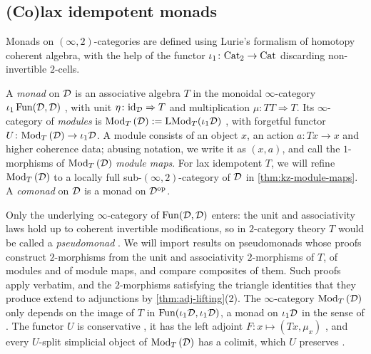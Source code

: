 \subsection{(Co)lax idempotent monads}
\label{subsec:prelim-monads}

%
Monads on $ (\infty, 2) $-categories are defined using
Lurie's formalism of homotopy coherent algebra, with the help of
the functor
$ \iota _{1} \colon \mathrm{Cat}_{2} \to \mathrm{Cat} $
discarding non-invertible $ 2 $-cells.

\begin{defi}
\label{def:monad}
%
A \emph{monad} on $\mathcal{D}$ is an associative algebra $T$ in the monoidal
$\infty$-category
$\iota_{1}\operatorname{Fun}(\mathcal{D},\mathcal{D})$
\cite[Def.~4.1.1.6]{ha}, with unit
$\eta\colon \mathrm{id}_{\mathcal{D}} \Rightarrow T$
and multiplication
$\mu\colon TT \Rightarrow T$.
Its $\infty$-category of \emph{modules} is
${\operatorname{Mod}_{T}\left(\mathcal{D}\right)} := \mathrm{LMod}_{T}(\iota_{1}\mathcal{D})$
\cite[Def.~4.2.1.13]{ha}, with forgetful functor
$U\colon {\operatorname{Mod}_{T}\left(\mathcal{D}\right)} \to \iota_{1}\mathcal{D}$.
A module consists of an object $x$, an action $a\colon Tx \to x$ and higher
coherence data; abusing notation, we write it as $(x,a)$,
and call the $1$-morphisms of ${\operatorname{Mod}_{T}\left(\mathcal{D}\right)}$ \emph{module maps}.
For lax idempotent $T$, we will refine ${\operatorname{Mod}_{T}\left(\mathcal{D}\right)}$ to a locally full
sub-$(\infty,2)$-category of $\mathcal{D}$ in \cref{thm:kz-module-maps}.
A \emph{comonad} on $\mathcal{D}$ is a monad on $\mathcal{D}^{\mathrm{op}}$.
\end{defi}

%
Only the underlying $\infty$-category of $\operatorname{Fun}(\mathcal{D},\mathcal{D})$ enters: the unit and
associativity laws hold up to coherent invertible modifications,
so in $2$-category theory $T$ would be called a \emph{pseudomonad}
\cite{marmolejo1997doctrines}. We will import results on pseudomonads whose
proofs construct $2$-morphisms from the unit and associativity $2$-morphisms of
$T$, of modules and of module maps, and compare composites of them. Such proofs
apply verbatim, and the $2$-morphisms satisfying the triangle identities that
they produce extend to adjunctions by \cref{thm:adj-lifting}(2).
The $\infty$-category ${\operatorname{Mod}_{T}\left(\mathcal{D}\right)}$ only depends on the image of $T$ in
$\operatorname{Fun}(\iota_{1}\mathcal{D},\iota_{1}\mathcal{D})$,
a monad on $\iota_{1}\mathcal{D}$ in the sense of
\cite[Def.~4.7.0.1]{ha}. The functor $U$ is conservative
\cite[Cor.~4.2.3.2]{ha}, it has the left adjoint
$F\colon x \mapsto (Tx,\mu_{x})$
\cite[Cor.~4.2.4.8]{ha}, and every $U$-split simplicial object of
${\operatorname{Mod}_{T}\left(\mathcal{D}\right)}$ has a colimit, which $U$ preserves \cite[Thm.~4.7.3.5]{ha}.

